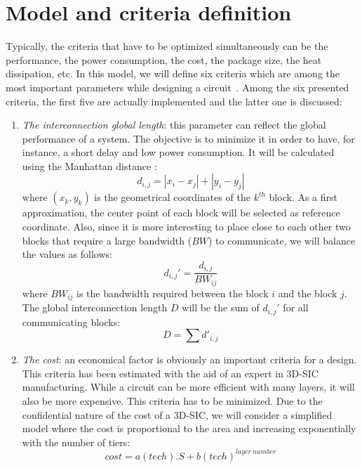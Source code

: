 \section{Model and criteria definition}
\label{sec:crit}
Typically, the criteria that have to be optimized simultaneously can be the performance, the power consumption, the cost, the package size, the heat dissipation, etc. In this model, we will define six criteria which are among the most important parameters while designing a circuit~\cite{DBLP:conf/3dic/MilojevicCCRRSAPM09}. Among the six presented criteria, the first five are actually implemented and the latter one is discussed:
\begin{enumerate}
\item \textit{The interconnection global length}: this parameter can reflect the global performance of a system. The objective is to minimize it in order to have, for instance, a short delay and low power consumption. It will be calculated using the Manhattan distance \cite{mandist06}:
\begin{equation}
d_{i,j}=|x_i-x_j|+|y_i-y_j|
\end{equation}
where $(x_k, y_k)$ is the geometrical coordinates of the $k^{th}$ block. As a first approximation, the center point of each block will be selected as reference coordinate. Also, since it is more interesting to place close to each other two blocks that require a large bandwidth ($BW$) to communicate, we will balance the values as follows:
\begin{equation}
d_{i,j}'=\frac{d_{i,j}}{BW_{ij}}
\end{equation}
where $BW_{ij}$ is the bandwidth required between the block $i$ and the block $j$. The global interconnection length $D$ will be the sum of $d_{i,j}'$ for all communicating blocks:
\begin{equation}
D=\sum d'_{i,j}
\end{equation}
\item \textit{The cost}: an economical factor is obviously an important criteria for a design. This criteria has been estimated with the aid of an expert in 3D-SIC manufacturing. While a circuit can be more efficient with many layers, it will also be more expensive. This criteria has to be minimized. Due to the confidential nature of the cost of a 3D-SIC, we will consider a simplified model where the cost is proportional to the area and increasing exponentially with the number of tiers:
\begin{equation}
cost=a(tech).S+b(tech)^{layer~number}
\label{eqn:cost}

\end{equation}
\end{enumerate}
